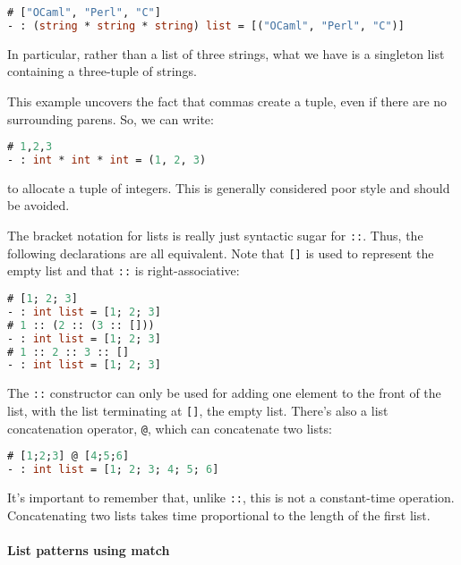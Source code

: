 \begin{lstlisting}[language=Caml]
# ["OCaml", "Perl", "C"]
- : (string * string * string) list = [("OCaml", "Perl", "C")]
\end{lstlisting}

In particular, rather than a list of three strings, what we have is a
singleton list containing a three-tuple of strings.

This example uncovers the fact that commas create a tuple, even if there
are no surrounding parens. So, we can write:

\begin{lstlisting}[language=Caml]
# 1,2,3
- : int * int * int = (1, 2, 3)
\end{lstlisting}

to allocate a tuple of integers. This is generally considered poor style
and should be avoided.

The bracket notation for lists is really just syntactic sugar for
\passthrough{\lstinline!::!}. Thus, the following declarations are all
equivalent. Note that \passthrough{\lstinline![]!} is used to represent
the empty list and that \passthrough{\lstinline!::!} is
right-associative:

\begin{lstlisting}[language=Caml]
# [1; 2; 3]
- : int list = [1; 2; 3]
# 1 :: (2 :: (3 :: []))
- : int list = [1; 2; 3]
# 1 :: 2 :: 3 :: []
- : int list = [1; 2; 3]
\end{lstlisting}

The \passthrough{\lstinline!::!} constructor can only be used for adding
one element to the front of the list, with the list terminating at
\passthrough{\lstinline![]!}, the empty list. There's also a list
concatenation operator, \passthrough{\lstinline!@!}, which can
concatenate two lists:

\begin{lstlisting}[language=Caml]
# [1;2;3] @ [4;5;6]
- : int list = [1; 2; 3; 4; 5; 6]
\end{lstlisting}

It's important to remember that, unlike \passthrough{\lstinline!::!},
this is not a constant-time operation. Concatenating two lists takes
time proportional to the length of the first list.

\hypertarget{list-patterns-using-match}{%
\paragraph{List patterns using match}\label{list-patterns-using-match}}

